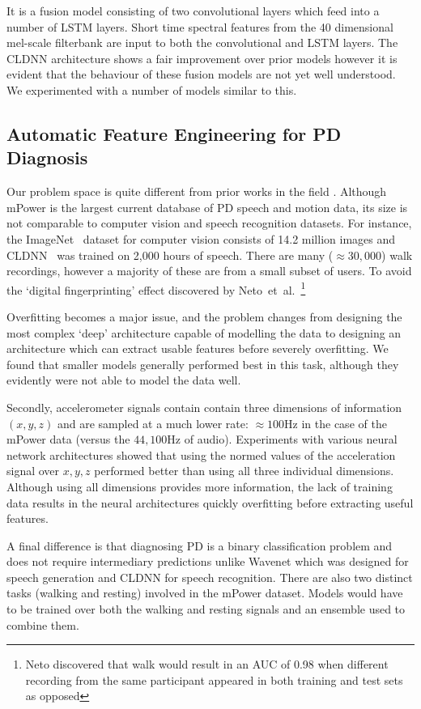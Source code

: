 \documentclass[12pt, twoside]{book}
\begin{document}
It is a fusion model consisting of two convolutional layers which feed into a number of LSTM layers. Short time spectral features from the 40 dimensional mel-scale filterbank are input to both the convolutional and LSTM layers. The CLDNN architecture shows a fair improvement over prior models however it is evident that the behaviour of these fusion models are not yet well understood. We experimented with a number of models similar to this.


\subsection{Automatic Feature Engineering for PD Diagnosis}

Our problem space is quite different from prior works in the field . Although mPower is the largest current database of PD speech and motion data, its size is not comparable to computer vision and speech recognition datasets. For instance, the ImageNet~\cite{imagenet} dataset for computer vision consists of 14.2 million images and CLDNN~\cite{convlstm} was trained on 2,000 hours of speech. There are many ($\approx30,000$) walk recordings, however a majority of these are from a small subset of users. To avoid the `digital fingerprinting' effect discovered by Neto~et~al.~\cite{mpowerneto2017analysis}\footnote{Neto discovered that walk would result in an AUC of 0.98 when different recording from the same participant appeared in both training and test sets as opposed}

Overfitting becomes a major issue, and the problem changes from designing the most complex `deep' architecture capable of modelling the data to designing an architecture which can extract usable features before severely overfitting. We found that smaller models generally performed best in this task, although they evidently were not able to model the data well. 

Secondly, accelerometer signals contain contain three dimensions of information $(x,y,z)$ and are sampled at a much lower rate: $\approx100$Hz in the case of the mPower data (versus the $44,100$Hz of audio). Experiments with various neural network architectures showed that using the normed values of the acceleration signal over $x,y,z$ performed better than using all three individual dimensions. Although using all dimensions provides more information, the lack of training data results in the neural architectures quickly overfitting before extracting useful features. 

A final difference is that diagnosing PD is a binary classification problem and does not require intermediary predictions unlike Wavenet which was designed for speech generation and CLDNN for speech recognition. There are also two distinct tasks (walking and resting) involved in the mPower dataset. Models would have to be trained over both the walking and resting signals and an ensemble used to combine them.  
\end{document}
